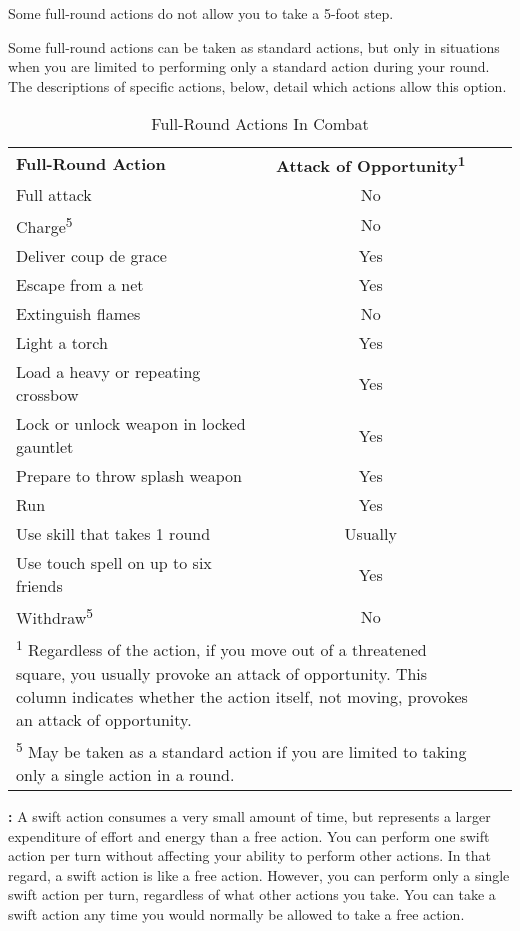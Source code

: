 Some full-round actions do not allow you to take a 5-foot step.

Some full-round actions can be taken as standard actions, but only in situations 
when you are limited to performing only a standard action during your round. The 
descriptions of specific actions, below, detail which actions allow this option.

\begin{table}[htb]
\caption{Full-Round Actions In Combat}
\centering
\begin{tabular}{l c l c}
\textbf{Full-Round Action} & \textbf{Attack of Opportunity\textsuperscript{1}}\\
Full attack & No\\
Charge\textsuperscript{5} & No\\
Deliver coup de grace & Yes\\
Escape from a net & Yes\\
Extinguish flames & No\\
Light a torch & Yes\\
Load a heavy or repeating crossbow & Yes\\
Lock or unlock weapon in locked gauntlet & Yes\\
Prepare to throw splash weapon & Yes\\
Run & Yes\\
Use skill that takes 1 round & Usually\\
Use touch spell on up to six friends & Yes\\
Withdraw\textsuperscript{5} & No\\
\multicolumn{2}{p{12.5cm}}{\textsuperscript{1} Regardless of the action, if you move out of a threatened square, you usually provoke an attack of opportunity. This column indicates whether the action itself, not moving, provokes an attack of opportunity.}\\
\multicolumn{2}{p{12.5cm}}{\textsuperscript{5} May be taken as a standard action if you are limited to taking only a single action in a round.}\\
\end{tabular}
\end{table}

\textbf{:} A swift action consumes a very small amount of time, but 
represents a larger expenditure of effort and energy than a free action. You can 
perform one swift action per turn without affecting your ability to perform other 
actions. In that regard, a swift action is like a free action. However, you can 
perform only a single swift action per turn, regardless of what other actions you 
take. You can take a swift action any time you would normally be allowed to take 
a free action.

